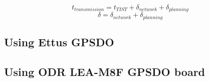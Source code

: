 \[
    t_{transmission} = t_{TIST} + \delta_{network} + \delta_{planning}
\]
\[
    \delta = \delta_{network} + \delta_{planning}
\]


\subsection{Using Ettus GPSDO}
\subsection{Using ODR LEA-M8F GPSDO board}


